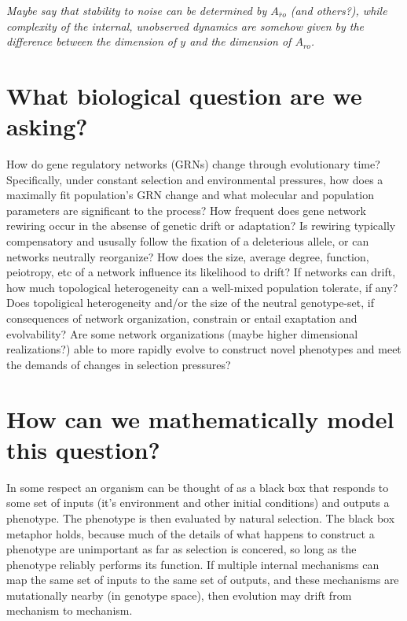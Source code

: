 \documentclass[11 pt]{article}
\newcommand{\plr}[1]{{\color{blue}\it #1}}
\newcommand{\ro}{{ro}}
\newcommand{\nro}{{\bar{r}o}}
\begin{document}
\plr{Maybe say that stability to noise can be determined by $A_\nro$ (and others?),
while complexity of the internal, unobserved dynamics
are somehow given by the difference between the dimension of $y$ and the dimension of $A_\ro$.}




\section{What biological question are we asking?}

How do gene regulatory networks (GRNs) change through evolutionary time?
Specifically, under constant selection and environmental pressures, how does a
maximally fit population's GRN change and what molecular and population
parameters are significant to the process? How frequent does gene network
rewiring occur in the absense of genetic drift or adaptation? Is rewiring
typically compensatory and ususally follow the fixation of a deleterious
allele, or can networks neutrally reorganize? How does the size, average
degree, function, peiotropy, etc of a network influence its likelihood to
drift? If networks can drift, how much topological heterogeneity can a
well-mixed population tolerate, if any? Does topoligical heterogeneity and/or
the size of the neutral genotype-set, if consequences of network organization,
constrain or entail exaptation and evolvability? Are some network organizations
(maybe higher dimensional realizations?) able to more rapidly evolve to
construct novel phenotypes and meet the demands of changes in selection
pressures?

\section{How can we mathematically model this question?}

In some respect an organism can be thought of as a black box that responds to
some set of inputs (it's environment and other initial conditions) and outputs
a phenotype. The phenotype is then evaluated by natural selection. The black
box metaphor holds, because much of the details of what happens to construct a
phenotype are unimportant as far as selection is concered, so long as the
phenotype reliably performs its function. If multiple internal mechanisms can
map the same set of inputs to the same set of outputs, and these mechanisms are
mutationally nearby (in genotype space), then evolution may drift from
mechanism to mechanism. 
\end{document}

